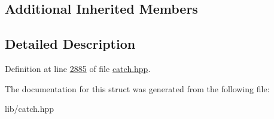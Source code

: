 \subsection*{Additional Inherited Members}


\subsection{Detailed Description}


Definition at line \mbox{\hyperlink{catch_8hpp_source_l02885}{2885}} of file \mbox{\hyperlink{catch_8hpp_source}{catch.\+hpp}}.



The documentation for this struct was generated from the following file\+:\begin{DoxyCompactItemize}
\item 
lib/catch.\+hpp\end{DoxyCompactItemize}
